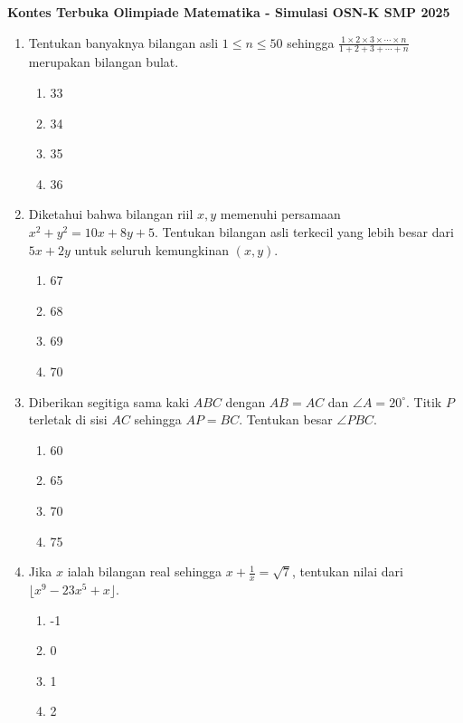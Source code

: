 \documentclass[12pt]{article}
\begin{document}
\begin{center}
    \textbf{\Large Kontes Terbuka Olimpiade Matematika - Simulasi OSN-K SMP 2025}
\end{center}

\vspace{0.5cm}

\begin{enumerate}

    \item Tentukan banyaknya bilangan asli $1 \le n \le 50$ sehingga 
    $\frac{1\times2\times3\times\cdots\times n}{1+2+3+\cdots+n}$ 
    merupakan bilangan bulat.
    \begin{enumerate}
        \item 33
        \item 34
        \item 35
        \item 36
    \end{enumerate}

    \item Diketahui bahwa bilangan riil $x, y$ memenuhi persamaan $x^{2}+y^{2}=10x+8y+5$. Tentukan bilangan asli terkecil yang lebih besar dari $5x+2y$ untuk seluruh kemungkinan $(x, y)$.
    \begin{enumerate}
        \item 67
        \item 68
        \item 69
        \item 70
    \end{enumerate}

    \item Diberikan segitiga sama kaki $ABC$ dengan $AB=AC$ dan $\angle A=20^{\circ}$. Titik $P$ terletak di sisi $AC$ sehingga $AP=BC$. Tentukan besar $\angle PBC$.
    \begin{enumerate}
        \item 60
        \item 65
        \item 70
        \item 75
    \end{enumerate}

    \item Jika $x$ ialah bilangan real sehingga $x+\frac{1}{x}=\sqrt{7}$, tentukan nilai dari $\lfloor x^{9}-23x^{5}+x \rfloor$.
    \begin{enumerate}
        \item -1
        \item 0
        \item 1
        \item 2
    \end{enumerate}


\end{enumerate}
\end{document}
